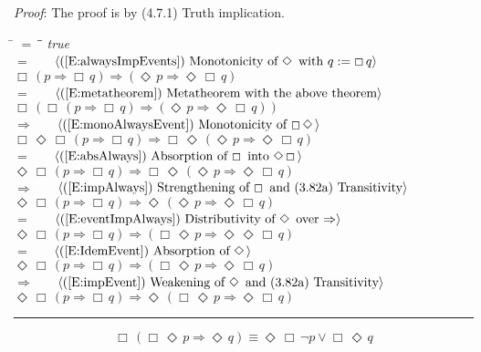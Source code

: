 \documentclass[12pt, fleqn, leqno]{article}
\newcommand{\lgap}{2pt}                             %
\newcommand{\mymathindent}{24pt}                    %
\newcommand{\impl}{\ensuremath{\Rightarrow}}        %
\newcommand{\Event}{\Diamond\,}
\newcommand{\Always}{\Box\,}
\newcommand{\myqed}{\rule[-.23ex]{1.2ex}{2.0ex}}
\newcommand{\myqedtab}{\hspace{384pt}}              %
\newcommand{\Gll} {\langle}                         %
\newcommand{\Ggg} {\rangle}                         %
\newcommand{\Hint}[1]     {\ \ \ $\Gll              \mbox{#1} \Ggg$ }   %
\begin{document}
{\emph{Proof}: The proof is by (4.7.1) Truth implication.
\begin{tabbing}
\hspace{\mymathindent} \= $= \;$ \= \myqedtab \= \kill
  \> \>   \textit{true}\\[\lgap]
  \> $=$  \>  \Hint{(\ref{E:alwaysImpEvents}) Monotonicity of $\Event$ with $q:=\Always q$}\\[\lgap]
  \> \>   $\Always (p \impl \Always q) \impl (\Event p \impl \Event\Always q)$\\[\lgap]
  \> $=$ \> \Hint{(\ref{E:metatheorem}) Metatheorem with the above theorem}\\[\lgap]
  \> \>   $\Always(\Always (p \impl \Always q) \impl (\Event p \impl \Event\Always q))$\\[\lgap]
  \> $\impl$ \> \Hint{(\ref{E:monoAlwaysEvent}) Monotonicity of $\Always\Event$}\\[\lgap]
  \> \>   $\Always\Event\Always (p \impl \Always q) \impl \Always\Event(\Event p \impl \Event\Always q)$\\[\lgap]
  \> $=$  \>  \Hint{(\ref{E:absAlways}) Absorption of $\Always$ into $\Event\Always$}\\[\lgap]
  \> \>   $\Event\Always (p \impl \Always q) \impl \Always\Event(\Event p \impl \Event\Always q)$\\[\lgap]
  \> $\impl$  \>  \Hint{(\ref{E:impAlways}) Strengthening of $\Always$ and (3.82a) Transitivity}\\[\lgap]
  \> \>   $\Event\Always (p \impl \Always q) \impl \Event(\Event p \impl \Event\Always q)$\\[\lgap]
  \> $=$  \>  \Hint{(\ref{E:eventImpAlways}) Distributivity of $\Event$ over $\impl$}\\[\lgap]
  \> \>   $\Event\Always (p \impl \Always q) \impl (\Always\Event p \impl \Event\Event\Always q)$\\[\lgap]
  \> $=$  \>  \Hint{(\ref{E:IdemEvent}) Absorption of $\Event$}\\[\lgap]
  \> \>   $\Event\Always (p \impl \Always q) \impl (\Always\Event p \impl \Event\Always q)$\\[\lgap]
      \> $\impl$  \> \Hint{(\ref{E:impEvent}) Weakening of $\Event$ and (3.82a) Transitivity}\\[\lgap]
  \> \>   $\Event\Always (p \impl \Always q) \impl \Event(\Always\Event p \impl \Event\Always q)$ \quad \myqed
\end{tabbing}
}
\begin{equation}\label{E:BenAriequiv1}
\Always (\Always\Event p \impl \Event q) \equiv \Event\Always\neg p \lor \Always\Event q
\end{equation}
\end{document}
